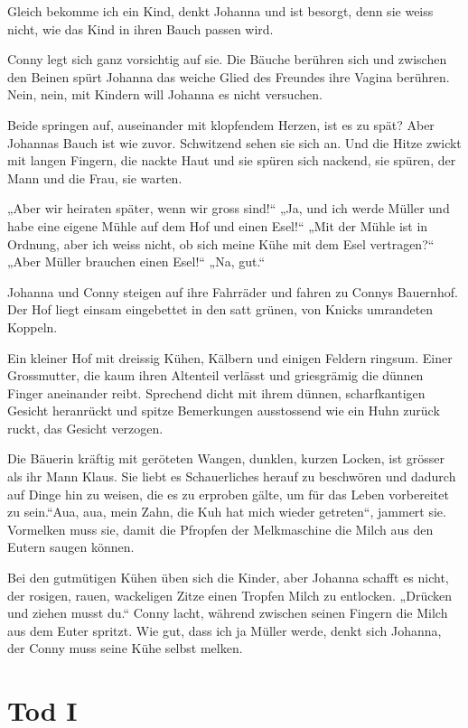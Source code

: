 \documentclass[10pt,a5paper]{book}
\begin{document}
Gleich bekomme ich ein Kind, denkt Johanna und ist besorgt, denn sie weiss nicht, wie das Kind in ihren Bauch passen wird.

Conny legt sich ganz vorsichtig auf sie. Die Bäuche berühren sich und zwischen den Beinen spürt Johanna das weiche Glied des Freundes ihre Vagina berühren. Nein, nein, mit Kindern will Johanna es nicht versuchen.

Beide springen auf, auseinander mit klopfendem Herzen, ist es zu spät? Aber Johannas Bauch ist wie zuvor. Schwitzend sehen sie sich an. Und die Hitze zwickt mit langen Fingern, die nackte Haut und sie spüren sich nackend, sie spüren, der Mann und die Frau, sie warten.

„Aber wir heiraten später, wenn wir gross sind!“ „Ja, und ich werde Müller und habe eine eigene Mühle auf dem Hof und einen Esel!“ „Mit der Mühle ist in Ordnung, aber ich weiss nicht, ob sich meine Kühe mit dem Esel vertragen?“ „Aber Müller brauchen einen Esel!“ „Na, gut.“

Johanna und Conny steigen auf ihre Fahrräder und fahren zu Connys Bauernhof. Der Hof liegt einsam eingebettet in den satt grünen, von Knicks umrandeten Koppeln.

Ein kleiner Hof mit dreissig Kühen, Kälbern und einigen Feldern ringsum. Einer Grossmutter, die kaum ihren Altenteil verlässt und griesgrämig die dünnen Finger aneinander  reibt. Sprechend dicht mit ihrem dünnen, scharfkantigen Gesicht heranrückt und spitze Bemerkungen ausstossend wie ein Huhn zurück ruckt, das Gesicht verzogen.

Die Bäuerin kräftig mit geröteten Wangen, dunklen, kurzen Locken, ist grösser als ihr Mann Klaus. Sie liebt es Schauerliches herauf zu beschwören und dadurch auf Dinge hin zu weisen, die es zu erproben gälte, um für das Leben vorbereitet zu sein.“Aua, aua, mein Zahn, die Kuh hat mich wieder getreten“, jammert sie. Vormelken muss sie, damit die Pfropfen der Melkmaschine die Milch aus den Eutern saugen können.

Bei den gutmütigen Kühen üben sich die Kinder, aber Johanna schafft es nicht, der rosigen, rauen, wackeligen Zitze einen Tropfen Milch zu entlocken. „Drücken und ziehen musst du.“ Conny lacht, während zwischen seinen Fingern die Milch aus dem Euter spritzt. Wie gut, dass ich ja Müller werde, denkt sich Johanna, der Conny muss seine Kühe selbst melken.


\section*{Tod I}
\end{document}
